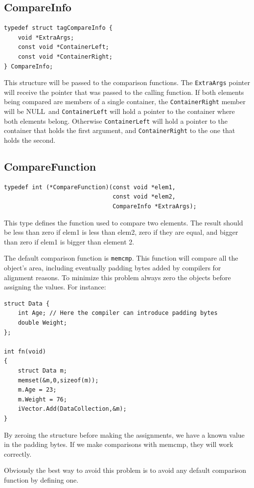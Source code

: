 \documentclass[12pt,a4paper,openany]{memoir} %
\newif\iftth
\newcommand{\Null}{{\iftth \ NULL \else \footnotesize NULL\  \fi}}
\begin{document}
\subsection{CompareInfo}
\begin{verbatim}
typedef struct tagCompareInfo {
    void *ExtraArgs;
    const void *ContainerLeft;
    const void *ContainerRight;
} CompareInfo;
\end{verbatim}
This structure will be passed to the comparison functions. The \verb,ExtraArgs, pointer will receive the pointer that was passed to the calling function. If both elements being compared are members of a single container, the \texttt{ContainerRight} member will be \Null and \verb,ContainerLeft,
will hold a pointer to the container where both elements belong. Otherwise \verb,ContainerLeft, will hold a pointer to the container that holds
the first argument, and \verb,ContainerRight, to the one that holds the second. 

\subsection{CompareFunction}
\begin{verbatim}
typedef int (*CompareFunction)(const void *elem1, 
                               const void *elem2, 
                               CompareInfo *ExtraArgs);
\end{verbatim}
This type defines the function used to compare two elements.
The result should be less than zero if elem1 is less than elem2, zero if they are equal, and bigger than zero if elem1 is bigger than element 2.

The default comparison function is \texttt{memcmp}. This function will compare all the object's area, including eventually padding bytes added by
compilers for alignment reasons. To minimize this problem always zero the objects before assigning the values. For instance:
\begin{verbatim}
struct Data {
    int Age; // Here the compiler can introduce padding bytes
    double Weight;
};

int fn(void)
{
    struct Data m;
    memset(&m,0,sizeof(m));
    m.Age = 23;
    m.Weight = 76;
    iVector.Add(DataCollection,&m);
}
\end{verbatim}
By zeroing the structure before making the assignments, we have a known value in the padding bytes. If we make comparisons with memcmp, they will
work correctly.

Obviously the best way to avoid this problem is to avoid any default comparison function by defining one.
\end{document}
